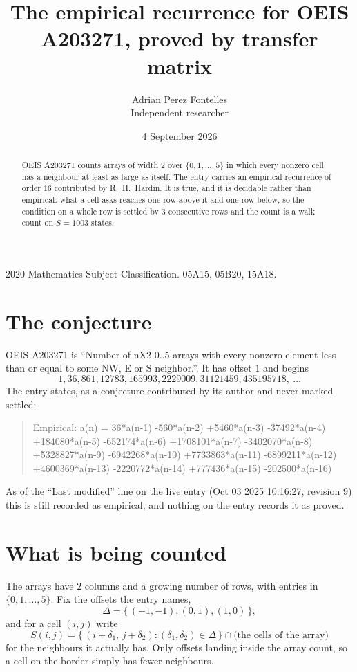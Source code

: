 \documentclass[11pt,a4paper]{article}
\title{The empirical recurrence for OEIS A203271, proved by transfer matrix}
\author{Adrian Perez Fontelles\\ \small Independent researcher}
\date{4 September 2026}
\theoremstyle{plain}
\theoremstyle{definition}
\begin{document}
\maketitle

\begin{abstract}
OEIS A203271 counts arrays of width $2$ over $\{0,1,\dots,5\}$ in which every nonzero cell has a neighbour at least as large as itself. The entry carries an
empirical recurrence of order $16$ contributed by R.~H.~Hardin. It is true, and it is
decidable rather than empirical: what a cell asks reaches one row above it and one row below, so the
condition on a whole row is settled by $3$ consecutive rows and the count is a walk
count on $S=1003$ states.
\end{abstract}

\noindent\small 2020 Mathematics Subject Classification. 05A15, 05B20, 15A18.\normalsize

\section{The conjecture}

OEIS A203271 is ``Number of nX2 0..5 arrays with every nonzero element less than or equal to some NW, E or S neighbor.''. It has offset $1$ and begins
\[
1, 36, 861, 12783, 165993, 2229009, 31121459, 435195718,\ \dots
\]
The entry states, as a conjecture contributed by its author and never marked settled:
\begin{quote}
Empirical: a(n) = 36*a(n-1) -560*a(n-2) +5460*a(n-3) -37492*a(n-4) +184080*a(n-5) -652174*a(n-6) +1708101*a(n-7) -3402070*a(n-8) +5328827*a(n-9) -6942268*a(n-10) +7733863*a(n-11) -6899211*a(n-12) +4600369*a(n-13) -2220772*a(n-14) +777436*a(n-15) -202500*a(n-16)
\end{quote}
As of the ``Last modified'' line on the live entry (Oct 03 2025 10:16:27, revision 9) this is still
recorded as empirical, and nothing on the entry records it as proved.

\section{What is being counted}

The arrays have $2$ columns and a growing number of rows, with entries in $\{0,1,\dots,5\}$. Fix the
offsets the entry names,
\[
\Delta=\{\,(-1,-1), (0,1), (1,0)\,\},
\]
and for a cell $(i,j)$ write
\[
S(i,j)=\{\,(i+\delta_1,\,j+\delta_2) : (\delta_1,\delta_2)\in\Delta\,\}\cap
\text{(the cells of the array)}
\]
for the neighbours it actually has. Only offsets landing inside the array count, so a cell on
the border simply has fewer neighbours.
\end{document}
